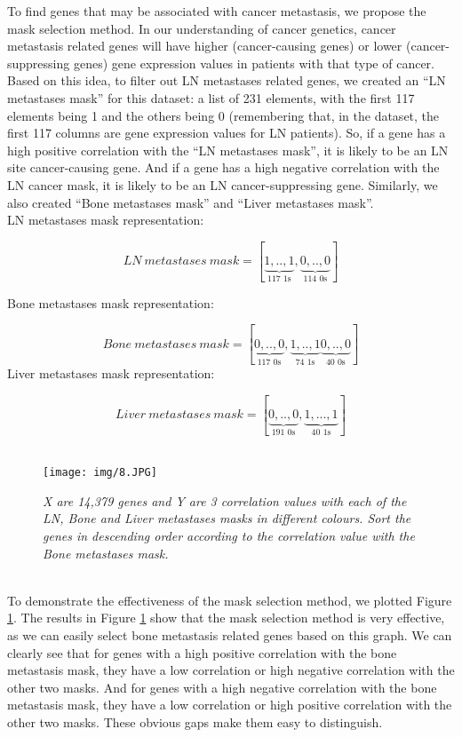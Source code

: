 \documentclass[12pt,a4paper]{report}
\begin{document}
To find genes that may be associated with cancer metastasis, we propose the mask selection method. In our understanding of cancer genetics, cancer metastasis related genes will have higher (cancer-causing genes) or lower (cancer-suppressing genes) gene expression values in patients with that type of cancer. Based on this idea, to filter out LN metastases related genes, we created an “LN metastases mask” for this dataset: a list of 231 elements, with the first 117 elements being 1 and the others being 0 (remembering that, in the dataset, the first 117 columns are gene expression values for LN patients). So, if a gene has a high positive correlation with the “LN metastases mask”, it is likely to be an LN site cancer-causing gene. And if a gene has a high negative correlation with the LN cancer mask, it is likely to be an LN cancer-suppressing gene. Similarly, we also created “Bone metastases mask” and “Liver metastases mask”. \\

LN metastases mask representation:   


\[
  LN \ metastases \ mask = [\underbrace{1,..,1}_\text{117 1s}, \underbrace{0,..,0}_\text{114 0s} ]
\]


Bone metastases mask representation:  
 
\[
  Bone \ metastases \ mask = [\underbrace{0,..,0}_\text{117 0s}, \underbrace{1,..,1}_\text{74 1s} \underbrace{0,..,0}_\text{40 0s} ]
\]
Liver metastases mask representation: 

\[
  Liver \ metastases \ mask = [\underbrace{0,..,0}_\text{191 0s}, \underbrace{1,...,1}_\text{40 1s} ]
\]
\\

\begin{figure}[h!]
\centering
\texttt{[image: img/8.JPG]}
\caption{\textit{X are 14,379  genes and Y are 3 correlation values with each of the LN, Bone and Liver metastases masks in different colours. Sort the genes in descending order according to the correlation value with the Bone metastases mask.}}
\label{fig:maskeff}
\end{figure}\\

To demonstrate the effectiveness of the mask selection method, we plotted Figure \ref{fig:maskeff}. The results in Figure \ref{fig:maskeff} show that the mask selection method is very effective, as we can easily select bone metastasis related genes based on this graph. We can clearly see that for genes with a high positive correlation with the bone metastasis mask, they have a low correlation or high negative correlation with the other two masks. And for genes with a high negative correlation with the bone metastasis mask, they have a low correlation or high positive correlation with the other two masks. These obvious gaps make them easy to distinguish.\\
\end{document}
